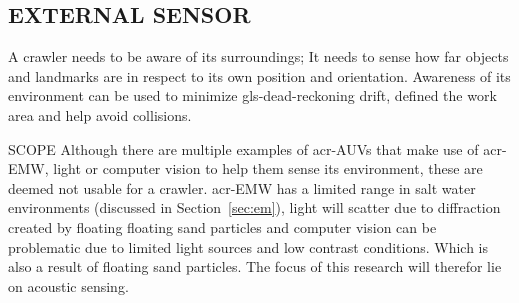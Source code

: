 \subsection{EXTERNAL SENSOR}\label{sec:sensorenvironment}

A crawler needs to be aware of its surroundings; It needs to sense how far objects and landmarks are in respect to its
own position and orientation. Awareness of its environment can be used to minimize \gls{gls-dead-reckoning} drift,
defined the work area and help avoid collisions.

\begin{RoyalNote}{SCOPE}
	Although there are multiple examples of \gls{acr-AUV}s that make use of \gls{acr-EMW}, light or computer vision to
	help  them sense its environment, these are deemed not usable for a crawler. \gls{acr-EMW} has a limited range in
	salt water  environments (discussed in Section~\ref{sec:em}), light will scatter due to diffraction created by floating
	floating sand  particles and computer vision can be problematic due to limited light sources and low contrast
	conditions. Which is  also a result of floating sand particles. The focus of this research will therefor lie on
	acoustic sensing.
\end{RoyalNote}
